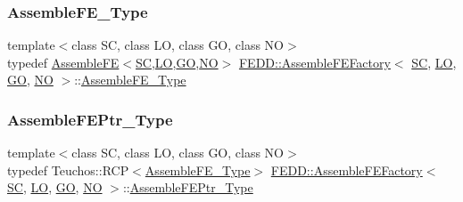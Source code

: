 \subsubsection{\texorpdfstring{Assemble\+F\+E\+\_\+\+Type}{AssembleFE\_Type}}
{\footnotesize\ttfamily template$<$class SC, class LO, class GO, class NO$>$ \\
typedef \hyperlink{classFEDD_1_1AssembleFE}{Assemble\+FE}$<$\hyperlink{fe__test__laplace_8cpp_a79c7e86a57edbb2a5a53242bcd04e41e}{SC},\hyperlink{fe__test__laplace_8cpp_ad6a38c9f07d3fd633eefca5bccad8410}{LO},\hyperlink{fe__test__laplace_8cpp_afa2946b509009b4f45eb04bd8c5b27d9}{GO},\hyperlink{fe__test__laplace_8cpp_a5e24f37b28787429872b6ecb1d0417ce}{NO}$>$ \hyperlink{classFEDD_1_1AssembleFEFactory}{F\+E\+D\+D\+::\+Assemble\+F\+E\+Factory}$<$ \hyperlink{fe__test__laplace_8cpp_a79c7e86a57edbb2a5a53242bcd04e41e}{SC}, \hyperlink{fe__test__laplace_8cpp_ad6a38c9f07d3fd633eefca5bccad8410}{LO}, \hyperlink{fe__test__laplace_8cpp_afa2946b509009b4f45eb04bd8c5b27d9}{GO}, \hyperlink{fe__test__laplace_8cpp_a5e24f37b28787429872b6ecb1d0417ce}{NO} $>$\+::\hyperlink{classFEDD_1_1AssembleFEFactory_a42c8b5387f23fea233cb2c9b2bfc379f}{Assemble\+F\+E\+\_\+\+Type}}

\mbox{\label{classFEDD_1_1AssembleFEFactory_aa7e0143080c2d0fbe8df0d26c55d6b5c}} 
\subsubsection{\texorpdfstring{Assemble\+F\+E\+Ptr\+\_\+\+Type}{AssembleFEPtr\_Type}}
{\footnotesize\ttfamily template$<$class SC, class LO, class GO, class NO$>$ \\
typedef Teuchos\+::\+R\+CP$<$\hyperlink{classFEDD_1_1AssembleFEFactory_a42c8b5387f23fea233cb2c9b2bfc379f}{Assemble\+F\+E\+\_\+\+Type}$>$ \hyperlink{classFEDD_1_1AssembleFEFactory}{F\+E\+D\+D\+::\+Assemble\+F\+E\+Factory}$<$ \hyperlink{fe__test__laplace_8cpp_a79c7e86a57edbb2a5a53242bcd04e41e}{SC}, \hyperlink{fe__test__laplace_8cpp_ad6a38c9f07d3fd633eefca5bccad8410}{LO}, \hyperlink{fe__test__laplace_8cpp_afa2946b509009b4f45eb04bd8c5b27d9}{GO}, \hyperlink{fe__test__laplace_8cpp_a5e24f37b28787429872b6ecb1d0417ce}{NO} $>$\+::\hyperlink{classFEDD_1_1AssembleFEFactory_aa7e0143080c2d0fbe8df0d26c55d6b5c}{Assemble\+F\+E\+Ptr\+\_\+\+Type}}



